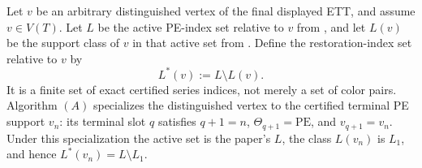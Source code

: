 \begin{definition}
Let \(v\) be an arbitrary distinguished vertex of the final displayed
ETT, and assume \(v\in V(T)\).  Let \(L\) be the active PE-index set
relative to \(v\) from , and let
\(L(v)\) be the support class of \(v\) in that active set from
.  Define the restoration-index set
relative to \(v\) by
\[
                         L^*(v):=L\setminus L(v).
\]
It is a finite set of exact certified series indices, not merely a set
of color pairs.  Algorithm \((A)\) specializes the distinguished vertex
to the certified terminal PE support \(v_n\): its terminal slot \(q\)
satisfies \(q+1=n\), \(\Theta_{q+1}=\mathrm{PE}\), and
\(v_{q+1}=v_n\).  Under this specialization the active set is the
paper's \(L\), the class \(L(v_n)\) is \(L_1\), and hence
\(L^*(v_n)=L\setminus L_1\).
\end{definition}
